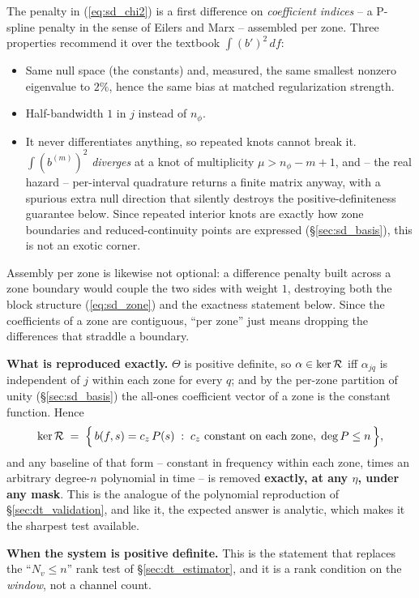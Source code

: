 \documentclass{article}
\numberwithin{equation}{section}   %
\begin{document}
The penalty in (\ref{eq:sd_chi2}) is a first difference on {\em coefficient indices} -- a P-spline penalty in
the sense of Eilers and Marx -- assembled per zone.  Three properties recommend it over the textbook
$\int (b')^2\,df$:
\begin{itemize}
\item Same null space (the constants) and, measured, the same smallest nonzero eigenvalue to $2\%$, hence the
same bias at matched regularization strength.
\item Half-bandwidth $1$ in $j$ instead of $n_\phi$.
\item It never differentiates anything, so repeated knots cannot break it.  $\int (b^{(m)})^2$ {\em diverges}
at a knot of multiplicity $\mu > n_\phi - m + 1$, and -- the real hazard -- per-interval quadrature returns a
finite matrix anyway, with a spurious extra null direction that silently destroys the positive-definiteness
guarantee below.  Since repeated interior knots are exactly how zone boundaries and reduced-continuity points
are expressed (\S\ref{sec:sd_basis}), this is not an exotic corner.
\end{itemize}
Assembly per zone is likewise not optional: a difference penalty built across a zone boundary would couple the
two sides with weight $1$, destroying both the block structure (\ref{eq:sd_zone}) and the exactness statement
below.  Since the coefficients of a zone are contiguous, ``per zone'' just means dropping the differences that
straddle a boundary.

{\bf What is reproduced exactly.}  $\Theta$ is positive definite, so $\alpha \in \ker{\cal R}$ iff
$\alpha_{jq}$ is independent of $j$ within each zone for every $q$; and by the per-zone partition of unity
(\S\ref{sec:sd_basis}) the all-ones coefficient vector of a zone is the constant function.  Hence
\begin{equation}
\ker{\cal R} \;=\; \Big\{\, b(f,s) = c_z\,P(s) \;:\; \mbox{$c_z$ constant on each zone},\; \deg P \le n \,\Big\} ,
\label{eq:sd_kernel}
\end{equation}
and any baseline of that form -- constant in frequency within each zone, times an arbitrary degree-$n$
polynomial in time -- is removed {\bf exactly, at any $\eta$, under any mask}.  This is the analogue of the
polynomial reproduction of \S\ref{sec:dt_validation}, and like it, the expected answer is analytic, which makes
it the sharpest test available.

{\bf When the system is positive definite.}  This is the statement that replaces the ``$N_v \le n$'' rank test
of \S\ref{sec:dt_estimator}, and it is a rank condition on the {\em window}, not a channel count.
\end{document}
